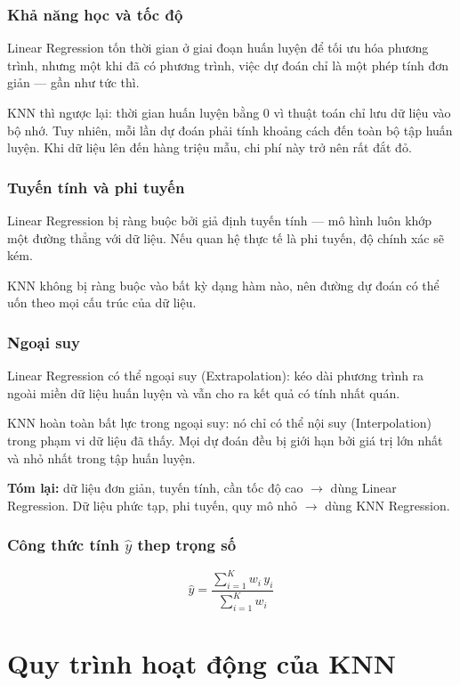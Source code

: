 \documentclass[12pt,a4paper]{article}
\begin{document}
\subsubsection{Khả năng học và tốc độ}

Linear Regression tốn thời gian ở giai đoạn huấn luyện để tối ưu hóa phương trình, nhưng một khi đã có phương trình, việc dự đoán chỉ là một phép tính đơn giản — gần như tức thì.

KNN thì ngược lại: thời gian huấn luyện bằng 0 vì thuật toán chỉ lưu dữ liệu vào bộ nhớ. Tuy nhiên, mỗi lần dự đoán phải tính khoảng cách đến toàn bộ tập huấn luyện. Khi dữ liệu lên đến hàng triệu mẫu, chi phí này trở nên rất đắt đỏ.

\subsubsection{Tuyến tính và phi tuyến}

Linear Regression bị ràng buộc bởi giả định tuyến tính — mô hình luôn khớp một đường thẳng với dữ liệu. Nếu quan hệ thực tế là phi tuyến, độ chính xác sẽ kém.

KNN không bị ràng buộc vào bất kỳ dạng hàm nào, nên đường dự đoán có thể uốn theo mọi cấu trúc của dữ liệu.

\subsubsection{Ngoại suy}

Linear Regression có thể ngoại suy (Extrapolation): kéo dài phương trình ra ngoài miền dữ liệu huấn luyện và vẫn cho ra kết quả có tính nhất quán.

KNN hoàn toàn bất lực trong ngoại suy: nó chỉ có thể nội suy (Interpolation) trong phạm vi dữ liệu đã thấy. Mọi dự đoán đều bị giới hạn bởi giá trị lớn nhất và nhỏ nhất trong tập huấn luyện.

\medskip
\noindent\textbf{Tóm lại:} dữ liệu đơn giản, tuyến tính, cần tốc độ cao $\to$ dùng Linear Regression. Dữ liệu phức tạp, phi tuyến, quy mô nhỏ $\to$ dùng KNN Regression.
\subsubsection{Công thức tính $\hat{y}$ thep trọng số}
\begin{equation}
    \hat{y} = \frac{\displaystyle\sum_{i=1}^{K} w_i\, y_i}
                   {\displaystyle\sum_{i=1}^{K} w_i}
\end{equation}
\section{Quy trình hoạt động của KNN}
\end{document}
